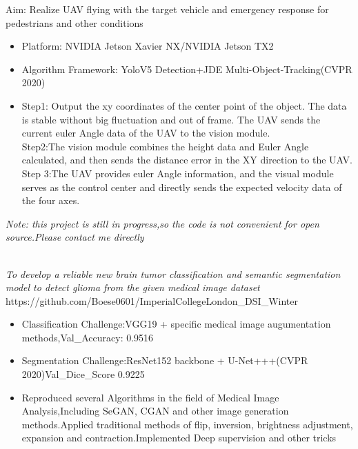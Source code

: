 \documentclass{resume}
\begin{document}
	\begin{onehalfspacing}
		Aim: Realize UAV flying with the target vehicle and emergency response for pedestrians and other conditions
		\begin{itemize}
			\item Platform: NVIDIA Jetson Xavier NX/NVIDIA Jetson TX2
			\item Algorithm Framework: YoloV5 Detection+JDE Multi-Object-Tracking(CVPR 2020)
			\item Step1: Output the xy coordinates of the center point of the object. The data is stable without big fluctuation and out of frame.
			The UAV sends the current euler Angle data of the UAV to the vision module.\\
			Step2:The vision module combines the height data and Euler Angle calculated, and then sends the distance error in the XY
			direction to the UAV.\\
			Step 3:The UAV provides euler Angle information, and the visual module serves as the control center and directly sends the
			expected velocity data of the four axes.
		\end{itemize}
		\textit{Note: this project is still in progress,so the code is not convenient for open source.Please contact me directly}
	\end{onehalfspacing}\\
	\textit{To develop a reliable new brain tumor classification and semantic segmentation model to detect glioma from the given medical image dataset}\\
	https://github.com/Boese0601/ImperialCollegeLondon\_DSI\_Winter
	\begin{itemize}
		\item Classification Challenge:VGG19 + specific medical image augumentation methods,Val\_Accuracy: 0.9516
		\item Segmentation Challenge:ResNet152 backbone + U-Net+++(CVPR 2020)Val\_Dice\_Score 0.9225
		\item Reproduced several Algorithms in the field of Medical Image Analysis,Including SeGAN, CGAN and other image generation methods.Applied traditional methods of flip, inversion, brightness adjustment, expansion and contraction.Implemented Deep supervision and other tricks
	\end{itemize}
\end{document}
